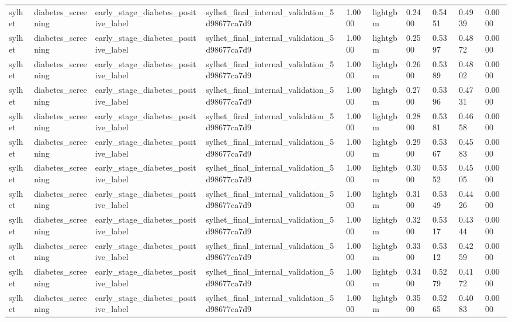 \begin{tabular}{llllllllll}
sylhet & diabetes\_screening & early\_stage\_diabetes\_positive\_label & sylhet\_final\_internal\_validation\_5d98677ca7d9 & 1.0000 & lightgbm & 0.2400 & 0.5451 & 0.4939 & 0.0000 \\
sylhet & diabetes\_screening & early\_stage\_diabetes\_positive\_label & sylhet\_final\_internal\_validation\_5d98677ca7d9 & 1.0000 & lightgbm & 0.2500 & 0.5397 & 0.4872 & 0.0000 \\
sylhet & diabetes\_screening & early\_stage\_diabetes\_positive\_label & sylhet\_final\_internal\_validation\_5d98677ca7d9 & 1.0000 & lightgbm & 0.2600 & 0.5389 & 0.4802 & 0.0000 \\
sylhet & diabetes\_screening & early\_stage\_diabetes\_positive\_label & sylhet\_final\_internal\_validation\_5d98677ca7d9 & 1.0000 & lightgbm & 0.2700 & 0.5396 & 0.4731 & 0.0000 \\
sylhet & diabetes\_screening & early\_stage\_diabetes\_positive\_label & sylhet\_final\_internal\_validation\_5d98677ca7d9 & 1.0000 & lightgbm & 0.2800 & 0.5381 & 0.4658 & 0.0000 \\
sylhet & diabetes\_screening & early\_stage\_diabetes\_positive\_label & sylhet\_final\_internal\_validation\_5d98677ca7d9 & 1.0000 & lightgbm & 0.2900 & 0.5367 & 0.4583 & 0.0000 \\
sylhet & diabetes\_screening & early\_stage\_diabetes\_positive\_label & sylhet\_final\_internal\_validation\_5d98677ca7d9 & 1.0000 & lightgbm & 0.3000 & 0.5352 & 0.4505 & 0.0000 \\
sylhet & diabetes\_screening & early\_stage\_diabetes\_positive\_label & sylhet\_final\_internal\_validation\_5d98677ca7d9 & 1.0000 & lightgbm & 0.3100 & 0.5349 & 0.4426 & 0.0000 \\
sylhet & diabetes\_screening & early\_stage\_diabetes\_positive\_label & sylhet\_final\_internal\_validation\_5d98677ca7d9 & 1.0000 & lightgbm & 0.3200 & 0.5317 & 0.4344 & 0.0000 \\
sylhet & diabetes\_screening & early\_stage\_diabetes\_positive\_label & sylhet\_final\_internal\_validation\_5d98677ca7d9 & 1.0000 & lightgbm & 0.3300 & 0.5312 & 0.4259 & 0.0000 \\
sylhet & diabetes\_screening & early\_stage\_diabetes\_positive\_label & sylhet\_final\_internal\_validation\_5d98677ca7d9 & 1.0000 & lightgbm & 0.3400 & 0.5279 & 0.4172 & 0.0000 \\
sylhet & diabetes\_screening & early\_stage\_diabetes\_positive\_label & sylhet\_final\_internal\_validation\_5d98677ca7d9 & 1.0000 & lightgbm & 0.3500 & 0.5265 & 0.4083 & 0.0000 \\

\end{tabular}
